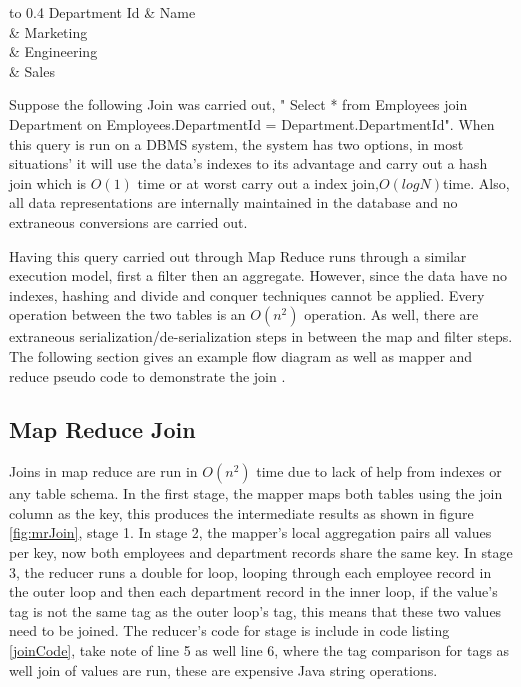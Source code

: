 \documentclass[10pt,twocolumn]{IEEEtran11}
\begin{document}
\begin{table}[h!]
	\centering
	\begin{tabu} to 0.4\textwidth { | X[l] | X[c] |}
		\hline
		 Department Id & Name\\ 
		  & Marketing   \\
		  & Engineering    \\
		& Sales  \\
		\hline
	\end{tabu}
	\caption{Hadoop vs DBMS-x performance}
	\label{table:hadoopVsDBMS}
\end{table}

Suppose the following Join was carried out, " Select * from Employees join Department on Employees.DepartmentId = Department.DepartmentId".
When this query is run on a DBMS system, the system has two options, in most situations' it will use the data's indexes to its advantage and carry out a hash join which is $O(1)$ time or at worst carry out a index join,$ O(log N) $time.  Also, all data representations are internally maintained in the database and no extraneous conversions are carried out.
\par
Having this query carried out through Map Reduce runs through a similar execution model, first a filter then an aggregate.  However, since the data have no indexes, hashing and divide and conquer techniques cannot be applied.  Every operation between the two tables is an $O(n^2)$ operation.  As well, there are extraneous serialization/de-serialization steps in between the map and filter steps.  The following section gives an example flow diagram as well as mapper and reduce pseudo code to demonstrate the join \cite{afrati2010optimizing}.

\subsection{Map Reduce Join}

Joins in map reduce are run in $O(n^2)$ time due to lack of help from indexes or any table schema.  In the first stage, the mapper maps both tables using the join column as the key, this produces the intermediate results as shown in figure \ref{fig:mrJoin}, stage 1.  In stage 2, the mapper's local aggregation pairs all values per key, now both employees and department records share the same key. In stage 3, the reducer  runs a double for loop, looping through each employee record in the outer loop and then each department record in the inner loop, if the value's tag is not the same tag as the outer loop's tag, this means that these two values need to be joined.  The reducer's code for stage is include in code listing \ref{joinCode}, take note of line 5 as well line 6, where the tag comparison for tags as well join of values are run, these are expensive Java string operations. 
\end{document}
